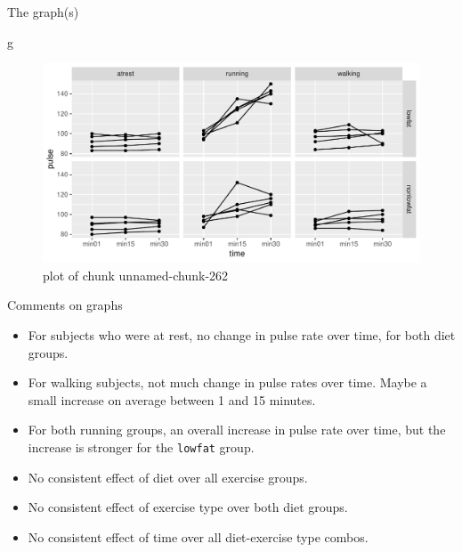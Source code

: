 \documentclass[ignorenonframetext,]{beamer}
\newenvironment{Shaded}{\begin{snugshade}}{\end{snugshade}}
\newcommand{\NormalTok}[1]{#1}
\begin{document}
\begin{frame}[fragile]{The graph(s)}
\protect\hypertarget{the-graphs}{}

\begin{Shaded}
\begin{Highlighting}[]
\NormalTok{g}
\end{Highlighting}
\end{Shaded}

\begin{figure}
\centering
\includegraphics{figure/unnamed-chunk-262-1.pdf}
\caption{plot of chunk unnamed-chunk-262}
\end{figure}

\end{frame}

\begin{frame}[fragile]{Comments on graphs}
\protect\hypertarget{comments-on-graphs}{}

\begin{itemize}
\item
  For subjects who were at rest, no change in pulse rate over time, for
  both diet groups.
\item
  For walking subjects, not much change in pulse rates over time. Maybe
  a small increase on average between 1 and 15 minutes.
\item
  For both running groups, an overall increase in pulse rate over time,
  but the increase is stronger for the \texttt{lowfat} group.
\item
  No consistent effect of diet over all exercise groups.
\item
  No consistent effect of exercise type over both diet groups.
\item
  No consistent effect of time over all diet-exercise type combos.
\end{itemize}

\end{frame}
\end{document}
